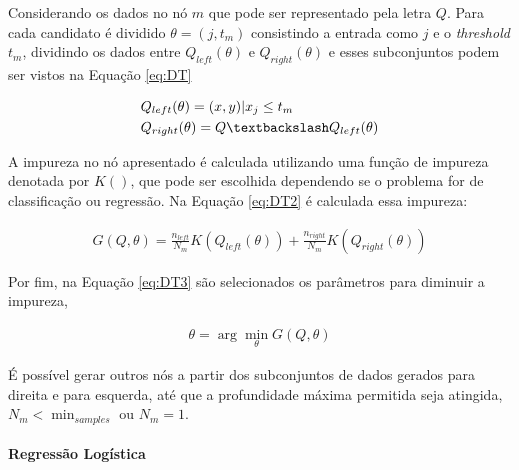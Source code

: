           Considerando os dados no nó $m$ que pode ser representado pela letra $Q$. Para cada candidato é dividido $\theta = (j,t_{m})$ consistindo 
          a entrada como $j$ e o \textit{threshold} $t_{m}$, dividindo os dados entre $Q_{left}(\theta)$ e $Q_{right}(\theta)$ e esses subconjuntos podem ser vistos na
          Equação \ref{eq:DT}


          \begin{equation}\label{eq:DT}
            \begin{aligned}
              & Q_{left}(\theta) = (x,y)|x_{j} \leq t_{m} \\
              & Q_{right}(\theta) = Q \textbackslash Q_{left}(\theta)
          \end{aligned}
          \end{equation}


          A impureza no nó apresentado é calculada utilizando uma função de impureza denotada por $K()$, que pode ser escolhida dependendo se o 
          problema for de classificação ou regressão. Na Equação \ref{eq:DT2} é calculada essa impureza:

          \begin{equation}\label{eq:DT2}
            \begin{aligned}
              G(Q,\theta) = \frac{n_{left}}{N_{m}}K(Q_{left}(\theta)) + \frac{n_{right}}{N_{m}}K(Q_{right}(\theta))
          \end{aligned}
          \end{equation}


          Por fim, na Equação \ref{eq:DT3} são selecionados os parâmetros para diminuir a impureza,

          \begin{equation}\label{eq:DT3}
            \begin{aligned}
              \theta = \arg\min_{\theta}G(Q,\theta)
          \end{aligned} 
          \end{equation}

          É possível gerar outros nós a partir dos subconjuntos de dados gerados para direita e para esquerda, 
          até que a profundidade máxima permitida seja atingida, $N_{m} < \min_{samples}$ ou $N_{m} = 1$.

        \paragraph{Regressão Logística}
        \label{par:reglog}

